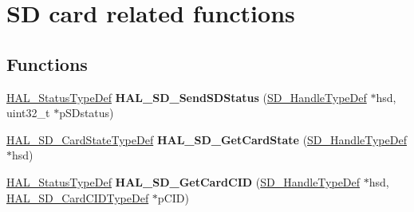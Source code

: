 \hypertarget{group___s_d___exported___functions___group4}{}\section{SD card related functions}
\label{group___s_d___exported___functions___group4}
\subsection*{Functions}
\begin{DoxyCompactItemize}
\item 
\mbox{\label{group___s_d___exported___functions___group4_ga5d1b022bb8fc58e83a1385126ef19b3a}} 
\mbox{\hyperlink{stm32f7xx__hal__def_8h_a63c0679d1cb8b8c684fbb0632743478f}{H\+A\+L\+\_\+\+Status\+Type\+Def}} {\bfseries H\+A\+L\+\_\+\+S\+D\+\_\+\+Send\+S\+D\+Status} (\mbox{\hyperlink{group___s_d___exported___types___group3_ga1f31eb64a86b0c740bb5c02fa4c9914d}{S\+D\+\_\+\+Handle\+Type\+Def}} $\ast$hsd, uint32\+\_\+t $\ast$p\+S\+Dstatus)
\item 
\mbox{\label{group___s_d___exported___functions___group4_ga61f65802034a18141e92ae669fdc844c}} 
\mbox{\hyperlink{group___s_d___exported___types___group2_ga3926af49b55cec7333a4bc8f05cd4870}{H\+A\+L\+\_\+\+S\+D\+\_\+\+Card\+State\+Type\+Def}} {\bfseries H\+A\+L\+\_\+\+S\+D\+\_\+\+Get\+Card\+State} (\mbox{\hyperlink{group___s_d___exported___types___group3_ga1f31eb64a86b0c740bb5c02fa4c9914d}{S\+D\+\_\+\+Handle\+Type\+Def}} $\ast$hsd)
\item 
\mbox{\label{group___s_d___exported___functions___group4_ga8005b60470ddda128e571a97ce7b798f}} 
\mbox{\hyperlink{stm32f7xx__hal__def_8h_a63c0679d1cb8b8c684fbb0632743478f}{H\+A\+L\+\_\+\+Status\+Type\+Def}} {\bfseries H\+A\+L\+\_\+\+S\+D\+\_\+\+Get\+Card\+C\+ID} (\mbox{\hyperlink{group___s_d___exported___types___group3_ga1f31eb64a86b0c740bb5c02fa4c9914d}{S\+D\+\_\+\+Handle\+Type\+Def}} $\ast$hsd, \mbox{\hyperlink{struct_h_a_l___s_d___card_c_i_d_type_def}{H\+A\+L\+\_\+\+S\+D\+\_\+\+Card\+C\+I\+D\+Type\+Def}} $\ast$p\+C\+ID)
\item 
\mbox{\label{group___s_d___exported___functions___group4_gae564ac3dff4eb7a4a325f4678e9fb183}} 

\end{DoxyCompactItemize}
